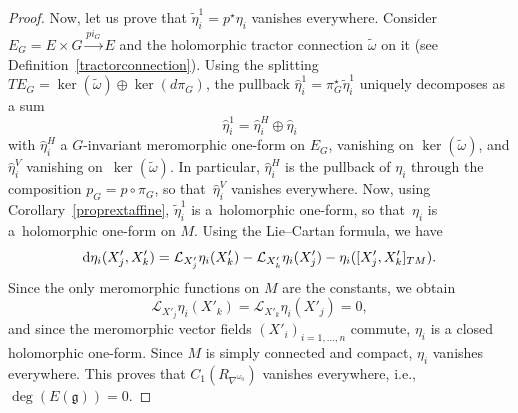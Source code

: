 \documentclass[pdftex]{sigma}
\numberwithin{equation}{section}
\begin{document}
\begin{proof}
Now, let us prove that $\tilde{\eta}^1_i = p^\star \eta_i$ vanishes everywhere. Consider $E_G=E\times G \overset{pi_G}{\longrightarrow}E$ and the holomorphic tractor connection $\tilde{\omega}$ on it (see Definition~\ref{tractorconnection}). Using the splitting $TE_G = \ker(\tilde{\omega}) \oplus \ker(d\pi_G)$, the pullback $\hat{\eta}^1_i= \pi_G^\star \tilde{\eta}^1_i$ uniquely decomposes as a sum
\[\hat{\eta}^1_i = \hat{\eta}_i^H \oplus \hat{\eta}_i \]
 with $\hat{\eta}_i^H$ a $G$-invariant meromorphic one-form on $E_G$, vanishing on $\ker(\tilde{\omega})$, and $\hat{\eta}^V_i$ vanishing on~$\ker(\tilde{\omega})$. In particular, $\hat{\eta}^H_i$ is the pullback of $\eta_i$ through the composition $p_G=p\circ \pi_G$, so that~$\hat{\eta}^V_i$ vanishes everywhere. Now, using Corollary~\ref{proprextaffine}, $\tilde{\eta}^1_i$ is a~holomorphic one-form, so that~$\eta_i$ is a~holomorphic one-form on $M$. Using the Lie--Cartan formula, we have
\[ {\rm d}\eta_i(X'_j,X'_k)=\mathcal{L}_{X'_j}\eta_i(X'_k) - \mathcal{L}_{X'_k}\eta_i(X'_j) - \eta_i([X'_j,X'_k]_{TM}). \]
 Since the only meromorphic functions on $M$ are the constants, we obtain \[\mathcal{L}_{X'_j}\eta_i(X'_k) =\mathcal{L}_{X'_k}\eta_i(X'_j) =0,\] and since the meromorphic vector fields $(X'_i)_{i=1,\dots,n}$ commute, $\eta_i$ is a closed holomorphic one-form. Since $M$ is simply connected and compact, $\eta_i$ vanishes everywhere. This proves that $C_1(R_{\nabla^{\omega_0}})$ vanishes everywhere, i.e., $\deg (E(\mathfrak{g}))=0$.


\end{proof}
\end{document}
